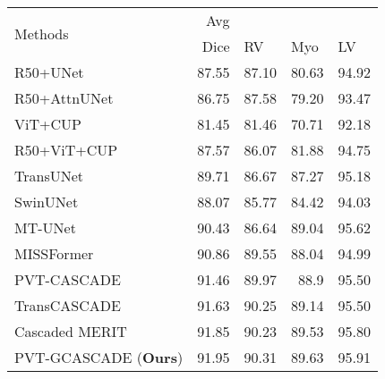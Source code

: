 \documentclass[10pt,twocolumn,letterpaper]{article}
\begin{document}
\begin{table}[]
\begin{center}
\begin{adjustbox}{width=0.48\textwidth}
\begin{tabular}{lrrrr}
\toprule
\multirow{2}{*}{Methods}        & Avg     & \multicolumn{3}{l}{} \\
& Dice & \multicolumn{1}{l}{RV} & \multicolumn{1}{l}{Myo} & \multicolumn{1}{l}{LV} \\
\midrule
R50+UNet   \cite{chen2021transunet}       & 87.55                        & 87.10                  & 80.63                   & 94.92                  \\
R50+AttnUNet  \cite{chen2021transunet}  & 86.75                        & 87.58                  & 79.20                   & 93.47                  \\
ViT+CUP \cite{chen2021transunet}   & 81.45                        & 81.46                  & 70.71                   & 92.18                 \\
R50+ViT+CUP \cite{chen2021transunet} & 87.57                        & 86.07                  & 81.88                   & 94.75                  \\
TransUNet  \cite{chen2021transunet}       & 89.71                        & 86.67                  & 87.27                   & 95.18                  \\
SwinUNet \cite{cao2021swin}         & 88.07                        & 85.77                  & 84.42                   & 94.03                  \\
MT-UNet \cite{wang2022mixed}         & 90.43                        & 86.64                  & 89.04                   & 95.62                  \\
MISSFormer \cite{huang2021missformer}         & 90.86                        & 89.55                  & 88.04                   & 94.99                  \\
PVT-CASCADE \cite{Rahman_2023_WACV}      & 91.46                        & 89.97                   & 88.9                   & 95.50                   \\
TransCASCADE \cite{Rahman_2023_WACV}    & 91.63                       & 90.25                   &  89.14                  & 95.50 \\
Cascaded MERIT \cite{rahman2023multi}    & 91.85                       & 90.23                   &  89.53                  & 95.80 \\
\midrule
PVT-GCASCADE (\textbf{Ours})    & 91.95                        & 90.31                  & 89.63                   & 95.91 \\

\end{tabular}
\end{adjustbox}
\end{center}
\end{table}
\end{document}
